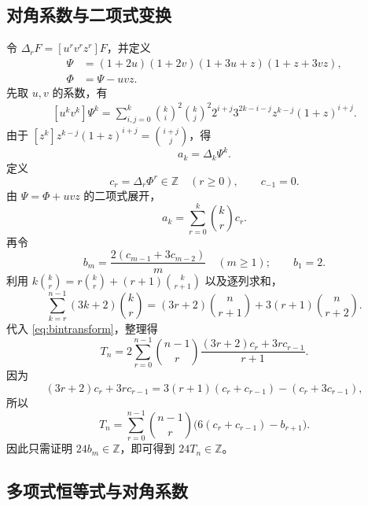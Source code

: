 \documentclass[a4paper,11pt]{article}
\numberwithin{equation}{section}
\theoremstyle{chinese}
\newcommand{\Z}{\mathbb Z}
\newcommand{\diag}{\Delta}
\begin{document}
\subsection{对角系数与二项式变换}
令 $\diag_r F=[u^rv^rz^r]F$，并定义
\begin{align}
\Psi&=(1+2u)(1+2v)(1+3u+z)(1+z+3vz),\\
\Phi&=\Psi-uvz.\label{eq:Phi}
\end{align}
先取 $u,v$ 的系数，有
\begin{equation}
\begin{split}
[u^kv^k]\Psi^k
=\sum_{i,j=0}^k\binom ki^2\binom kj^2
2^{i+j}3^{2k-i-j}z^{k-j}(1+z)^{i+j}.
\end{split}
\end{equation}
由于 $[z^k]z^{k-j}(1+z)^{i+j}=\binom{i+j}{j}$，得
\begin{equation}\label{eq:adiag}
a_k=\diag_k\Psi^k.
\end{equation}
定义
\begin{equation}\label{eq:c}
c_r=\diag_r\Phi^r\in\Z\quad(r\ge0),\qquad c_{-1}=0.
\end{equation}
由 $\Psi=\Phi+uvz$ 的二项式展开，
\begin{equation}\label{eq:bintransform}
a_k=\sum_{r=0}^k\binom kr c_r.
\end{equation}
再令
\begin{equation}\label{eq:b}
b_m=\frac{2(c_{m-1}+3c_{m-2})}{m}\quad(m\ge1);
\qquad b_1=2.
\end{equation}
利用 $k\binom kr=r\binom kr+(r+1)\binom{k}{r+1}$ 以及逐列求和，
\begin{equation}
\sum_{k=r}^{n-1}(3k+2)\binom kr
=(3r+2)\binom n{r+1}+3(r+1)\binom n{r+2}.
\end{equation}
代入 \eqref{eq:bintransform}，整理得
\begin{equation}
T_n=2\sum_{r=0}^{n-1}\binom{n-1}{r}
\frac{(3r+2)c_r+3rc_{r-1}}{r+1}.
\end{equation}
因为
\[
(3r+2)c_r+3rc_{r-1}
=3(r+1)(c_r+c_{r-1})-(c_r+3c_{r-1}),
\]
所以
\begin{equation}\label{eq:bridge}
\displaystyle
T_n=\sum_{r=0}^{n-1}\binom{n-1}{r}
\bigl(6(c_r+c_{r-1})-b_{r+1}\bigr).
\end{equation}
因此只需证明 $24b_m\in\Z$，即可得到 $24T_n\in\Z$。

\subsection{多项式恒等式与对角系数}
\end{document}
